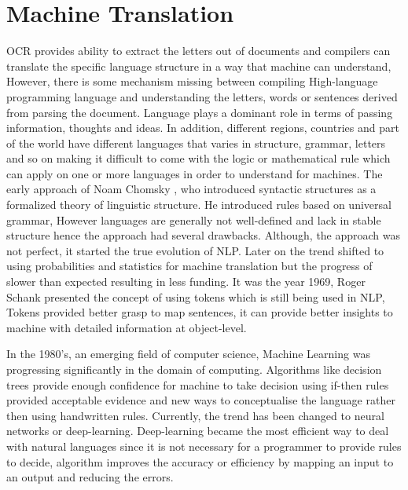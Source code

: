 \section{Machine Translation}

OCR provides ability to extract the letters out of documents and compilers can translate the specific language structure in a way that machine can understand, However, there is some mechanism missing between compiling High-language programming language and understanding the letters, words or sentences derived from parsing the document. Language plays a dominant role in terms of passing information, thoughts and ideas. In addition, different regions, countries and part of the world have different languages that varies in structure, grammar, letters and so on making it difficult to come with the logic or mathematical rule which can apply on one or more languages in order to understand for machines. The early approach of Noam Chomsky \cite{robert1957review}, who introduced syntactic structures as a formalized theory of linguistic structure. He introduced rules based on universal grammar, However languages are generally not well-defined and lack in stable structure hence the approach had several drawbacks. Although, the approach was not perfect, it started the true evolution of NLP. Later on the trend shifted to using probabilities and statistics for machine translation but the progress of slower than expected resulting in less funding. It was the year 1969, Roger Schank presented the concept of using tokens \cite{tokenization_history} which is still being used in NLP, Tokens provided better grasp to map sentences, it can provide better insights to machine with detailed information at object-level. 

In the 1980's, an emerging field of computer science, Machine Learning was progressing significantly in the domain of computing. Algorithms like decision trees provide enough confidence for machine to take decision using if-then rules provided acceptable evidence and new ways to conceptualise the language rather then using handwritten rules. Currently, the trend has been changed to neural networks or deep-learning. Deep-learning became the most efficient way to deal with natural languages since it is not necessary for a programmer to provide rules to decide, algorithm improves the accuracy or efficiency by mapping an input to an output and reducing the errors. 